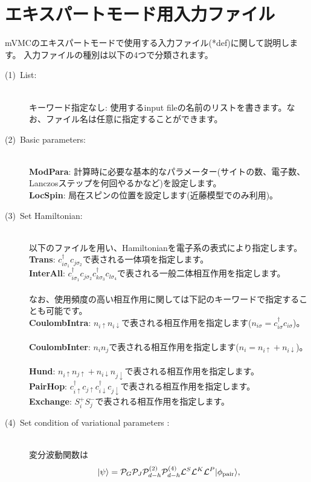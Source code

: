 \newpage
\section{エキスパートモード用入力ファイル}
\label{Ch:HowToExpert}

mVMCのエキスパートモードで使用する入力ファイル(*def)に関して説明します。
入力ファイルの種別は以下の4つで分類されます。
\begin{description}
\item[(1)~List:]
~\\{キーワード指定なし}:
使用するinput fileの名前のリストを書きます。なお、ファイル名は任意に指定することができます。
\item[(2)~Basic parameters:]
~\\{\bf ModPara}: 計算時に必要な基本的なパラメーター(サイトの数、電子数、Lanczosステップを何回やるかなど)を設定します。
~\\{\bf LocSpin}: 局在スピンの位置を設定します(近藤模型でのみ利用)。
\item[(3)~Set Hamiltonian:] 
~\\以下のファイルを用い、Hamiltonianを電子系の表式により指定します。
~\\{\bf Trans}: $c_{i\sigma_1}^{\dag}c_{j\sigma_2}$で表される一体項を指定します。
~\\{\bf InterAll}: $c_ {i \sigma_1}^{\dag}c_{j\sigma_2}c_{k \sigma_3}^{\dag}c_{l \sigma_4}$で表される一般二体相互作用を指定します。\\
~\\なお、使用頻度の高い相互作用に関しては下記のキーワードで指定することも可能です。
~\\{\bf CoulombIntra}: $n_ {i \uparrow}n_{i \downarrow}$で表される相互作用を指定します($n_{i \sigma}=c_{i\sigma}^{\dag}c_{i\sigma}$)。
~\\{\bf CoulombInter}: $n_ {i}n_{j}$で表される相互作用を指定します($n_i=n_{i\uparrow}+n_{i\downarrow}$)。
~\\{\bf Hund}: $n_{i\uparrow}n_{j\uparrow}+n_{i\downarrow}n_{j\downarrow}$で表される相互作用を指定します。
~\\{\bf PairHop}:  $c_ {i \uparrow}^{\dag}c_{j\uparrow}c_{i \downarrow}^{\dag}c_{j  \downarrow}$で表される相互作用を指定します。
~\\{\bf Exchange}: $S_i^+ S_j^-$で表される相互作用を指定します。
\item[(4)~Set condition of variational parameters :] 
~\\変分波動関数は
\begin{equation}
|\psi \rangle = {\cal P}_G{\cal P}_J{\cal P}_{d-h}^{(2)}{\cal P}_{d-h}^{(4)}{\cal L}^S{\cal L}^K{\cal L}^P |\phi_{\rm pair} \rangle,

\end{equation}
\end{description}
